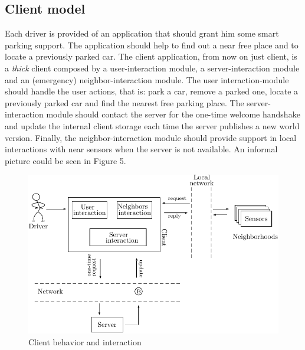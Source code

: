 \documentclass[11pt]{article}
\begin{document}
\subsection{Client model}
Each driver is provided of an application that should grant him some smart parking support. The application should help to find out a near free place and to locate a previously parked car. The client application, from now on just client, is a \emph{thick} client composed by a user-interaction module, a server-interaction module and an (emergency) neighbor-interaction module. The user interaction-module should handle the user actions, that is: park a car, remove a parked one, locate a previously parked car and find the nearest free parking place. The server-interaction module should contact the server for the one-time welcome handshake and update the internal client storage each time the server publishes a new world version. Finally, the neighbor-interaction module should provide support in local interactions with near sensors when the server is not available. An informal picture could be seen in Figure 5.
\begin{figure}
  \centering
	\includegraphics[scale=1]{client}
  \caption{Client behavior and interaction}
\end{figure}
\end{document}

